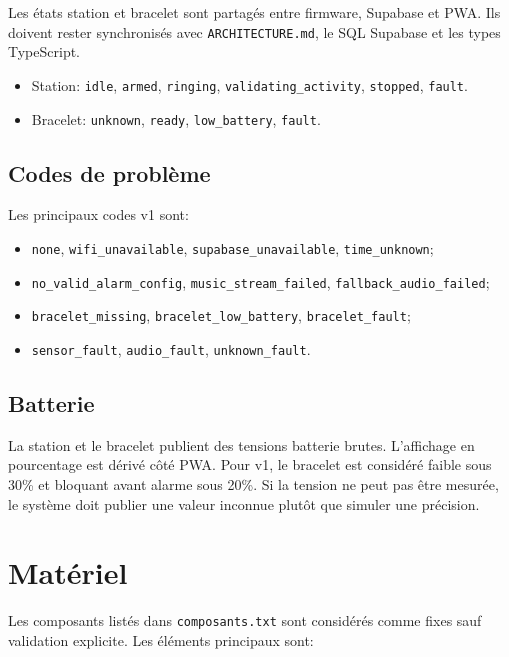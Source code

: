 \documentclass[11pt,a4paper]{article}
\begin{document}
Les états station et bracelet sont partagés entre firmware, Supabase et PWA. Ils doivent rester synchronisés avec \texttt{ARCHITECTURE.md}, le SQL Supabase et les types TypeScript.

\begin{itemize}
  \item Station: \texttt{idle}, \texttt{armed}, \texttt{ringing}, \texttt{validating\_activity}, \texttt{stopped}, \texttt{fault}.
  \item Bracelet: \texttt{unknown}, \texttt{ready}, \texttt{low\_battery}, \texttt{fault}.
\end{itemize}

\subsection{Codes de problème}

Les principaux codes v1 sont:

\begin{itemize}
  \item \texttt{none}, \texttt{wifi\_unavailable}, \texttt{supabase\_unavailable}, \texttt{time\_unknown};
  \item \texttt{no\_valid\_alarm\_config}, \texttt{music\_stream\_failed}, \texttt{fallback\_audio\_failed};
  \item \texttt{bracelet\_missing}, \texttt{bracelet\_low\_battery}, \texttt{bracelet\_fault};
  \item \texttt{sensor\_fault}, \texttt{audio\_fault}, \texttt{unknown\_fault}.
\end{itemize}

\subsection{Batterie}

La station et le bracelet publient des tensions batterie brutes. L'affichage en pourcentage est dérivé côté PWA. Pour v1, le bracelet est considéré faible sous 30\% et bloquant avant alarme sous 20\%. Si la tension ne peut pas être mesurée, le système doit publier une valeur inconnue plutôt que simuler une précision.

\section{Matériel}

Les composants listés dans \texttt{composants.txt} sont considérés comme fixes sauf validation explicite. Les éléments principaux sont:
\end{document}

